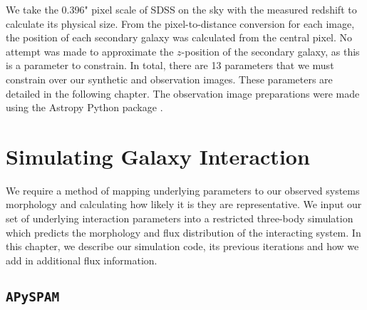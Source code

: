 We take the 0.396" pixel scale of SDSS on the sky with the measured redshift to calculate its physical size. From the pixel-to-distance conversion for each image, the position of each secondary galaxy was calculated from the central pixel. No attempt was made to approximate the $z$-position of the secondary galaxy, as this is a parameter to constrain. In total, there are 13 parameters that we must constrain over our synthetic and observation images. These parameters are detailed in the following chapter. The observation image preparations were made using the Astropy Python package \citep{astropy_2013, astropy_2018}.

\section{Simulating Galaxy Interaction}\label{Methods: sims}
\noindent We require a method of mapping underlying parameters to our observed systems morphology and calculating how likely it is they are representative. We input our set of underlying interaction parameters into a restricted three-body simulation which predicts the morphology and flux distribution of the interacting system. In this chapter, we describe our simulation code, its previous iterations and how we add in additional flux information.

\subsection{\texttt{APySPAM}}\label{sec:simulations}
